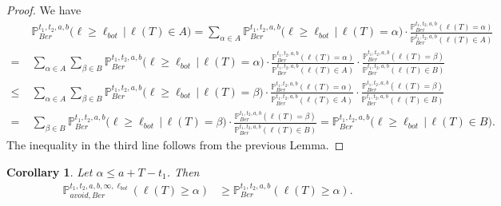 \documentclass[12pt]{article}
\newtheorem{cor}{Corollary}
\begin{document}
	\begin{proof}
		We have
		\begin{align*}
			& \mathbb{P}^{t_1, t_2, a, b}_{Ber}\big(\ell \geq \ell_{bot}\,\big|\,\ell(T) \in A\big) = \sum_{\alpha\in A} \mathbb{P}^{t_1, t_2, a, b}_{Ber}\big(\ell \geq \ell_{bot}\,\big|\,\ell(T) = \alpha\big) \cdot \frac{\mathbb{P}^{t_1, t_2, a, b}_{Ber}(\ell(T) = \alpha)}{\mathbb{P}^{t_1, t_2, a, b}_{Ber}(\ell(T) \in A)}\\
			= \; & \sum_{\alpha\in A}\sum_{\beta\in B} \mathbb{P}^{t_1, t_2, a, b}_{Ber}\big(\ell \geq \ell_{bot}\,\big|\,\ell(T) = \alpha\big) \cdot \frac{\mathbb{P}^{t_1, t_2, a, b}_{Ber}(\ell(T) = \alpha)}{\mathbb{P}^{t_1, t_2, a, b}_{Ber}(\ell(T) \in A)} \cdot \frac{\mathbb{P}^{t_1, t_2, a, b}_{Ber}(\ell(T) = \beta)}{\mathbb{P}^{t_1, t_2, a, b}_{Ber}(\ell(T) \in B)}\\
			\leq \; & \sum_{\alpha\in A}\sum_{\beta\in B} \mathbb{P}^{t_1, t_2, a, b}_{Ber}\big(\ell \geq \ell_{bot}\,\big|\,\ell(T) = \beta\big) \cdot \frac{\mathbb{P}^{t_1, t_2, a, b}_{Ber}(\ell(T) = \alpha)}{\mathbb{P}^{t_1, t_2, a, b}_{Ber}(\ell(T) \in A)} \cdot \frac{\mathbb{P}^{t_1, t_2, a, b}_{Ber}(\ell(T) = \beta)}{\mathbb{P}^{t_1, t_2, a, b}_{Ber}(\ell(T) \in B)}\\
			= \; & \sum_{\beta \in B} \mathbb{P}^{t_1, t_2, a, b}_{Ber}\big(\ell \geq \ell_{bot}\,\big|\,\ell(T) = \beta\big) \cdot \frac{\mathbb{P}^{t_1, t_2, a, b}_{Ber}(\ell(T) = \beta)}{\mathbb{P}^{t_1, t_2, a, b}_{Ber}(\ell(T) \in B)} = \mathbb{P}^{t_1, t_2, a, b}_{Ber}\big(\ell \geq \ell_{bot}\,\big|\,\ell(T) \in B\big).
		\end{align*}
		The inequality in the third line follows from the previous Lemma.
	\end{proof}

	\begin{cor}
		Let $\alpha \leq a + T - t_1$. Then
		\begin{align*}
		\mathbb{P}^{t_1,t_2,a,b,\infty,\ell_{bot}}_{avoid,Ber} (\ell(T)\geq\alpha) &\geq \mathbb{P}^{t_1,t_2,a,b}_{Ber} (\ell(T)\geq \alpha).
		\end{align*}
	\end{cor}
\end{document}
